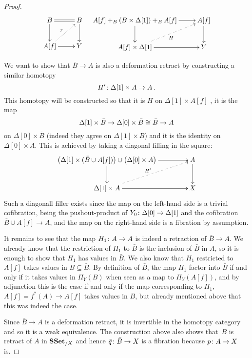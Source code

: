 \documentclass[reqno,10pt,a4paper,oneside,draft]{amsart}
\begin{document}
\begin{proof}
\[\xymatrix{
B \ar[d] \ar@{=}[r]  & B \ar[d] \\
A[f] \ar[r] \ar@{.>}[ur]^r  & Y 
} \quad \xymatrix{
\displaystyle A[f] +_B \left( B \times \Delta[1] \right) +_B A[f] \ar[d] \ar[r]  & A[f] \ar[d] \\
A[f] \times \Delta[1] \ar[r] \ar@{.>}[ur]_H  & Y 
}\]

We want to show that $\bar{B} \rightarrow A$ is also a deformation retract by constructing a similar homotopy 
\[
H' \colon \Delta[1] \times A \rightarrow A \, .
\] 
This homotopy will be constructed so that it is $H$ on $\Delta[1] \times A[f]$ ,  it is the map 
\[
\Delta[1] \times \bar{B} \rightarrow \Delta[0]  \times \bar{B} \cong \bar{B} \rightarrow A
\] 
on $\Delta[0] \times \bar{B} $ (indeed they agree on $\Delta[1] \times B$) and it is the identity on $\Delta[0] \times A$.  This is achieved by taking a diagonal filling in the square:
\[
\xymatrix@C=1.5cm{
\big( \Delta[1] \times (\bar{B} \cup A[f]) \big)  \cup \big( \Delta[0] \times A \big) \ar[d] \ar[r] & A \ar[d] \\
\Delta[1] \times A \ar[r] \ar@{.>}[ur]^{H'} & X
}\]
Such a diagonall filler exists since the map on the left-hand side is a trivial cofibration, being the 
 pushout-product of $Y_0 \colon \Delta[0] \rightarrow \Delta[1]$ and the cofibration $\bar{B} \cup A[f] \rightarrow A$, and the map on the right-hand side is a fibration by assumption.

It remains to see that the map $H_{1} \colon A \rightarrow A$ is indeed a retraction of $\bar{B} \rightarrow A$. We already know that the restriction of $H_{1}$ to $\bar{B}$ is  the inclusion of $\bar{B}$ in $A$, so it is enough to show that $H_{1}$ has values in $\bar{B}$. We also know that $H_{1}$ restricted to $A[f]$ takes values in $B \subseteq \bar{B}$. By definition of $\bar{B}$, the map $H_1$ factor into $\bar{B}$ if and only if it takes values in $\Pi_Y(B)$ when seen as a map to $\Pi_Y(A[f])$, and by adjunction this is the case if and only if the map corresponding to $H_1$, $A[f]= f^*(A) \rightarrow A[f]$ takes values in $B$, but already mentioned above that this was indeed the case.

Since $\bar{B} \rightarrow A$ is a deformation retract, it is invertible in the homotopy category and so it is a weak equivalence. The construction above also shows that~$\bar{B}$ is retract of $A$ in $\mathbf{SSet}_{/X}$ and hence $\bar{q} \colon \bar{B} \rightarrow X$ is a fibration because $p \colon A \rightarrow X$ is.
\end{proof}
\end{document}
